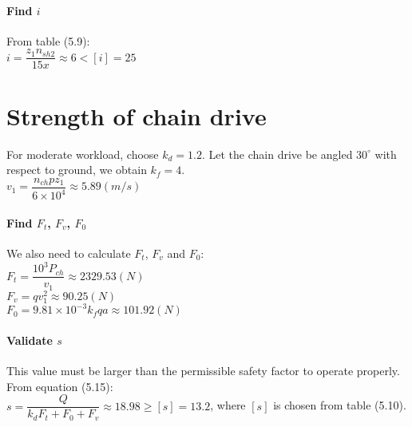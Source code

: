 \paragraph{Find $ i $} From table (5.9):\\ $i=\dfrac{z_1n_{sh2}}{15x}\approx6<[i]=25 $


\section{Strength of chain drive}
For moderate workload, choose $ k_d = 1.2 $. Let the chain drive be angled $ 30^\circ$ with respect to ground, we obtain $ k_f = 4 $.\\
$ v_1=\dfrac{n_{ch}pz_1}{6\times10^4}\approx 5.89 \unit{(m/s)}$
\paragraph{Find $ F_t $, $ F_v $, $ F_0 $}
We also need to calculate $ F_t $, $ F_v $ and $ F_0 $:\\
$ F_t = \dfrac{10^3P_{ch}}{v_1} \approx 2329.53 \unit{(N)}$\\
$ F_v=qv_1^2\approx 90.25 \unit{(N)} $\\
$ F_0=9.81\times10^{-3}k_fqa \approx101.92\unit{(N)}$
\paragraph{Validate $ s $} This value must be larger than the permissible safety factor to operate properly.  From equation (5.15):\\ $ s = \dfrac{Q}{k_dF_t+F_0+F_v} \approx 18.98 \geq [s]=13.2 $, where $ [s] $ is chosen from table (5.10). 
